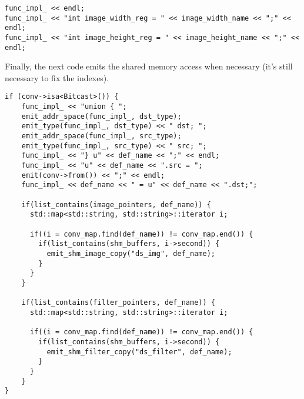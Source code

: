 \documentclass{article}
\begin{document}
\begin{verbatim}
func_impl_ << endl;
func_impl_ << "int image_width_reg = " << image_width_name << ";" << endl;
func_impl_ << "int image_height_reg = " << image_height_name << ";" << endl;
\end{verbatim}

Finally, the next code emits the shared memory access when necessary (it's still necessary to fix the indexes).

\begin{verbatim}
if (conv->isa<Bitcast>()) {
    func_impl_ << "union { ";
    emit_addr_space(func_impl_, dst_type);
    emit_type(func_impl_, dst_type) << " dst; ";
    emit_addr_space(func_impl_, src_type);
    emit_type(func_impl_, src_type) << " src; ";
    func_impl_ << "} u" << def_name << ";" << endl;
    func_impl_ << "u" << def_name << ".src = ";
    emit(conv->from()) << ";" << endl;
    func_impl_ << def_name << " = u" << def_name << ".dst;";

    if(list_contains(image_pointers, def_name)) {
      std::map<std::string, std::string>::iterator i;

      if((i = conv_map.find(def_name)) != conv_map.end()) {
        if(list_contains(shm_buffers, i->second)) {
          emit_shm_image_copy("ds_img", def_name);
        }
      }
    }

    if(list_contains(filter_pointers, def_name)) {
      std::map<std::string, std::string>::iterator i;

      if((i = conv_map.find(def_name)) != conv_map.end()) {
        if(list_contains(shm_buffers, i->second)) {
          emit_shm_filter_copy("ds_filter", def_name);
        }
      }
    }
}
\end{verbatim}
\end{document}
